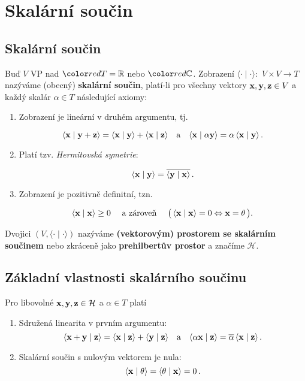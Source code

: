\section{Skalární součin}

\subsection*{Skalární součin}

Buď $V$ VP nad $\clr{red}{T=\R}$ nebo $\clr{red}{\CC}$. Zobrazení $\langle
    \cdot\mid\cdot\rangle :$ $V\times V \rightarrow T$ nazýváme (obecný)
\textbf{skalární součin}, platí-li pro všechny vektory $\mathbf{x},\mathbf{y},\mathbf{z}\in V$ a
každý skalár $\alpha\in T$ následující axiomy:

\begin{enumerate}
    \item Zobrazení je lineární v druhém argumentu, tj.

          \[ \langle \mathbf{x}\mid \mathbf{y} +\mathbf{z}\rangle =\langle \mathbf{x}\mid \mathbf{y}\rangle +\langle \mathbf{x}\mid \mathbf{z}\rangle\quad \text{a}\quad
              \langle \mathbf{x}\mid \alpha \mathbf{y}\rangle=\alpha\, \langle \mathbf{x}\mid \mathbf{y}\rangle\,. \]

    \item Platí tzv. \emph{Hermitovská symetrie}:

          \[ \langle \mathbf{x} \mid \mathbf{y}\rangle =\overline{\langle \mathbf{y}\mid \mathbf{x} \rangle}\,. \]

    \item Zobrazení je pozitivně definitní, tzn.

          \[ \langle \mathbf{x} \mid \mathbf{x} \rangle \geq0 \quad \text{ a zároveň }\quad
              \big(\,\langle \mathbf{x} \mid \mathbf{x} \rangle =0 \Leftrightarrow \mathbf{x} =\theta\,\big). \]
\end{enumerate}

Dvojici $(V, \langle \cdot \mid \cdot \rangle)$ nazýváme \textbf{(vektorovým)
    prostorem se skalárním součinem} nebo zkráceně jako \textbf{prehilbertův
    prostor} a značíme $\mathcal{H}$.

\subsection*{Základní vlastnosti skalárního součinu}

Pro libovolné $\mathbf{x},\mathbf{y},\mathbf{z}\in\mathcal{H}$ a $\alpha\in T$ platí

\begin{enumerate}
    \item Sdružená linearita v prvním argumentu:
          \[ \langle \mathbf{x} +\mathbf{y}\mid \mathbf{z}\rangle=\langle \mathbf{x}\mid \mathbf{z}\rangle+\langle \mathbf{y}\mid \mathbf{z}\rangle\quad \text{a}\quad
              \langle \alpha \mathbf{x} \mid \mathbf{z}\rangle=\overline{\alpha}\,\langle \mathbf{x}\mid \mathbf{z}\rangle\,. \]

    \item Skalární součin s nulovým vektorem je nula:
          \[ \langle \mathbf{x}\mid \theta\rangle=\langle \theta\mid \mathbf{x}\rangle=0\,. \]
\end{enumerate}

